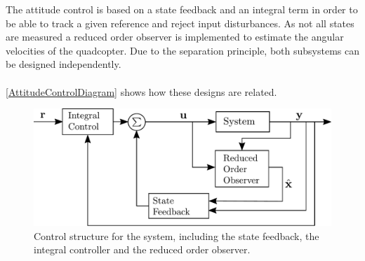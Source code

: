 The attitude control is based on a state feedback and an integral term in order to be able to track a given reference and reject input disturbances. As not all states are measured a reduced order observer is implemented to estimate the angular velocities of the quadcopter. Due to the separation principle, both subsystems can be designed independently. \cite{ssReference}
\\
\\
\noindent\autoref{AttitudeControlDiagram} shows how these designs are related.
\begin{figure}[H]
    \centering
    \includegraphics[width=.4\textwidth]{figures/AttitudeControlDiagram}
    \caption{ Control structure for the system, including the state feedback, the integral controller and the reduced order observer.}
    \label{AttitudeControlDiagram}
\end{figure}


